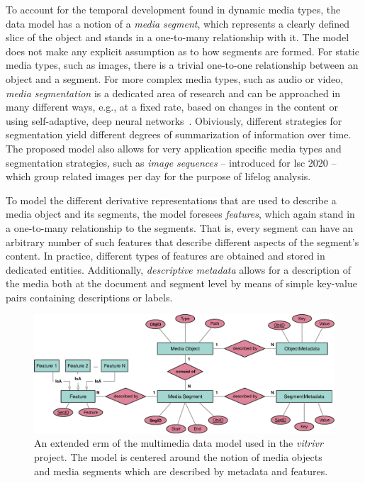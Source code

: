 To account for the temporal development found in dynamic media types, the data model has a notion of a \emph{media segment}, which represents a clearly defined slice of the object and stands in a one-to-many relationship with it. The model does not make any explicit assumption as to how segments are formed. For static media types, such as images, there is a trivial one-to-one relationship between an object and a segment. For more complex media types, such as audio or video, \emph{media segmentation} is a dedicated area of research \cite{Koprinska:2001temporal} and can be approached in many different ways, e.g., at a fixed rate, based on changes in the content \cite{Foote:2000Automatic,Tsai:2016video} or using self-adaptive, deep neural networks~\cite{Souvcek:2019transnet}. Obiviously, different strategies for segmentation yield different degrees of summarization of information over time. The proposed model also allows for very application specific media types and segmentation strategies, such as \emph{image sequences} -- introduced for \acrshort{lsc} 2020 \cite{Heller:2020Interactive} -- which group related images per day for the purpose of lifelog analysis.

To model the different derivative representations that are used to describe a media object and its segments, the model foresees \emph{features}, which again stand in a one-to-many relationship to the segments. That is, every segment can have an arbitrary number of such features that describe different aspects of the segment's content. In practice, different types of features are obtained and stored in dedicated entities. Additionally, \emph{descriptive metadata} allows for a description of the media both at the document and segment level by means of simple key-value pairs containing descriptions or labels.

\begin{figure}[bt]
    \centering
    \includegraphics[width=\textwidth]{figures/erm-media-data-vitrivr}
    \caption{An extended \acrshort{erm} of the multimedia data model used in the \emph{vitrivr} project. The model is centered around the notion of media objects and media segments which are described by metadata and features.}
    \label{figure:erm_mediadata_vitrivr}
\end{figure}

